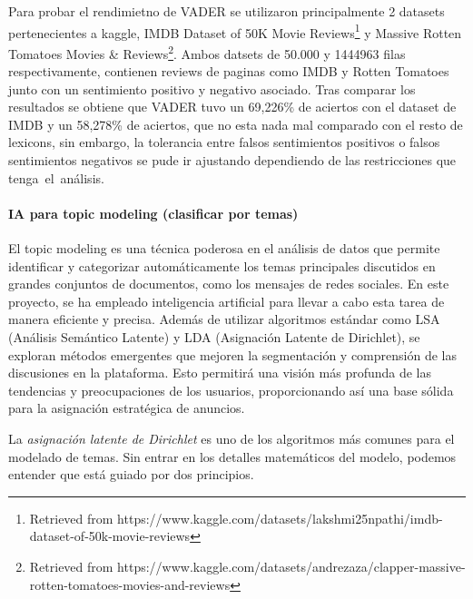 \documentclass[
  letterpaper,
  DIV=11,
  numbers=noendperiod]{scrartcl}
\let\oldparagraph\paragraph
\renewcommand{\paragraph}[1]{\oldparagraph{#1}\mbox{}}
\begin{document}
Para probar el rendimietno de VADER se utilizaron principalmente 2
datasets pertenecientes a kaggle, IMDB Dataset of 50K Movie
Reviews\footnote{Retrieved from
https://www.kaggle.com/datasets/lakshmi25npathi/imdb-dataset-of-50k-movie-reviews
} y Massive Rotten Tomatoes Movies \&
Reviews\footnote{Retrieved from https://www.kaggle.com/datasets/andrezaza/clapper-massive-rotten-tomatoes-movies-and-reviews}.
Ambos datsets de 50.000 y 1444963 filas respectivamente, contienen
reviews de paginas como IMDB y Rotten Tomatoes junto con un sentimiento
positivo y negativo asociado. Tras comparar los resultados se obtiene
que VADER tuvo un 69,226\% de aciertos con el dataset de IMDB y un
58,278\% de aciertos, que no esta nada mal comparado con el resto de
lexicons, sin embargo, la tolerancia entre falsos sentimientos positivos
o falsos sentimientos negativos se pude ir ajustando dependiendo de las
restricciones que tenga~el~análisis.

\paragraph{IA para topic modeling (clasificar por
temas)}\label{ia-para-topic-modeling-clasificar-por-temas}

El topic modeling es una técnica poderosa en el análisis de datos que
permite identificar y categorizar automáticamente los temas principales
discutidos en grandes conjuntos de documentos, como los mensajes de
redes sociales. En este proyecto, se ha empleado inteligencia artificial
para llevar a cabo esta tarea de manera eficiente y precisa. Además de
utilizar algoritmos estándar como LSA (Análisis Semántico Latente) y LDA
(Asignación Latente de Dirichlet), se exploran métodos emergentes que
mejoren la segmentación y comprensión de las discusiones en la
plataforma. Esto permitirá una visión más profunda de las tendencias y
preocupaciones de los usuarios, proporcionando así una base sólida para
la asignación estratégica de anuncios.

La \emph{asignación latente de Dirichlet} es uno de los algoritmos más
comunes para el modelado de temas. Sin entrar en los detalles
matemáticos del modelo, podemos entender que está guiado por dos
principios.
\end{document}
